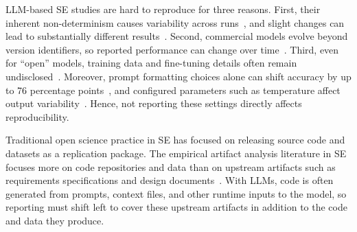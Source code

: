 \documentclass[smallextended]{svjour3}
\begin{document}
LLM-based SE studies are hard to reproduce for three reasons.
First, their inherent non-determinism causes variability across runs~\cite{DBLP:conf/naacl/SongWLL25, DBLP:journals/corr/abs-2602-07150}, and slight changes can lead to substantially different results~\cite{DBLP:conf/nips/AgarwalSCCB21, DBLP:journals/corr/abs-2412-12509}.
Second, commercial models evolve beyond version identifiers, so reported performance can change over time~\cite{DBLP:journals/corr/abs-2307-09009}.
Third, even for ``open'' models, training data and fine-tuning details often remain undisclosed~\cite{Gibney2024}.
Moreover, prompt formatting choices alone can shift accuracy by up to 76 percentage points~\cite{DBLP:conf/iclr/Sclar0TS24}, and configured parameters such as temperature affect output variability~\cite{renze2024temperature}.
Hence, not reporting these settings directly affects reproducibility.

Traditional open science practice in SE has focused on releasing source code and datasets as a replication package. The empirical artifact analysis literature in SE focuses more on code repositories and data than on upstream artifacts such as requirements specifications and design documents~\cite{DBLP:journals/jss/LiuHHXZJCM24}. With LLMs, code is often generated from prompts, context files, and other runtime inputs to the model, so reporting must shift left to cover these upstream artifacts in addition to the code and data they produce.
\end{document}
